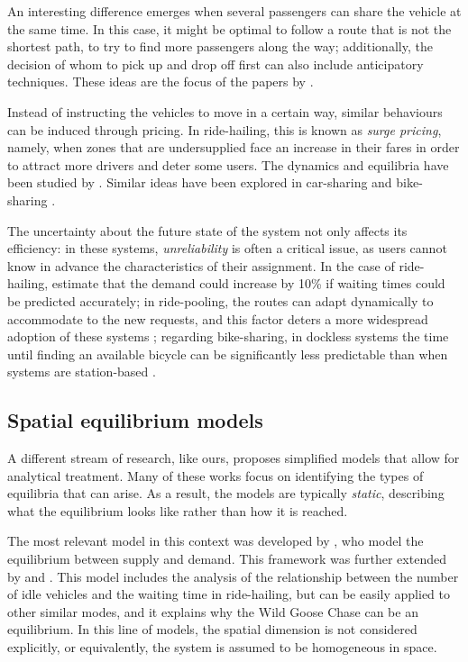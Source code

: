 \documentclass[12pt,english]{article}
\begin{document}
An interesting difference emerges when several passengers can share the vehicle at the same time. In this case, it might be optimal to follow a route that is not the shortest path, to try to find more passengers along the way; additionally, the decision of whom to pick up and drop off first can also include anticipatory techniques. These ideas are the focus of the papers by \cite{alonso2017predictive,fielbaum2022anticipatory}.

Instead of instructing the vehicles to move in a certain way, similar behaviours can be induced through pricing. In ride-hailing, this is known as \textit{surge pricing}, namely, when zones that are undersupplied face an increase in their fares in order to attract more drivers and deter some users. The dynamics and equilibria have been studied by \cite{besbes2021surge,hu2022surge,yan2020dynamic}. Similar ideas have been explored in car-sharing \citep{zakharenko2023pricing} and bike-sharing \citep{emami2024integrated}.

The uncertainty about the future state of the system not only affects its efficiency: in these systems, \textit{unreliability} is often a critical issue, as users cannot know in advance the characteristics of their assignment. In the case of ride-hailing, \cite{bansal2020impact} estimate that the demand could increase by 10\% if waiting times could be predicted accurately; in ride-pooling, the routes can adapt dynamically to accommodate to the new requests, and this factor deters a more widespread adoption of these systems \citep{fielbaum2020unreliability,zhang2024barrier,alonso2020value}; regarding bike-sharing, in dockless systems the time until finding an available bicycle can be significantly less predictable than when systems are station-based \citep{beauvoir2020unreliability}. 

\subsection{Spatial equilibrium models}
A different stream of research, like ours, proposes simplified models that allow for analytical treatment. Many of these works focus on identifying the types of equilibria that can arise. As a result, the models are typically \textit{static}, describing what the equilibrium looks like rather than how it is reached.

The most relevant model in this context was developed by \cite{castillo2017surge}, who model the equilibrium between supply and demand. This framework was further extended by \cite{yan2020dynamic} and \cite{fielbaum2024idle}. This model includes the analysis of the relationship between the number of idle vehicles and the waiting time in ride-hailing, but can be easily applied to other similar modes, and it explains why the Wild Goose Chase can be an equilibrium. In this line of models, the spatial dimension is not considered explicitly, or equivalently, the system is assumed to be homogeneous in space.
\end{document}
